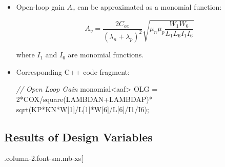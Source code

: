 \documentclass[
]{article}
\newenvironment{Shaded}{}{}
\newcommand{\CommentTok}[1]{\textcolor[rgb]{0.38,0.63,0.69}{\textit{#1}}}
\newcommand{\DecValTok}[1]{\textcolor[rgb]{0.25,0.63,0.44}{#1}}
\newcommand{\NormalTok}[1]{#1}
\begin{document}
\begin{itemize}
\item
  Open-loop gain \(A_v\) can be approximated as a monomial function:

  \[A_v =  \frac{2 C_{ox}}{(\lambda_n + \lambda_p)^2} \sqrt{\mu_n \mu_p \frac{W_1 W_6}{L_1 L_6 I_1 I_6}}\]

  where \(I_1\) and \(I_6\) are monomial functions.
\item
  Corresponding C++ code fragment:

\begin{Shaded}
\begin{Highlighting}[]
\CommentTok{// Open Loop Gain}
\NormalTok{monomial\textless{}aaf\textgreater{} OLG = }\DecValTok{2}\NormalTok{*COX/square(LAMBDAN+LAMBDAP)*}
\NormalTok{     sqrt(KP*KN*W[}\DecValTok{1}\NormalTok{]/L[}\DecValTok{1}\NormalTok{]*W[}\DecValTok{6}\NormalTok{]/L[}\DecValTok{6}\NormalTok{]/I1/I6);}
\end{Highlighting}
\end{Shaded}
\end{itemize}

\hypertarget{results-of-design-variables}{%
\subsection{Results of Design Variables}\label{results-of-design-variables}}

.column-2.font-sm.mb-xs{[}
\end{document}
